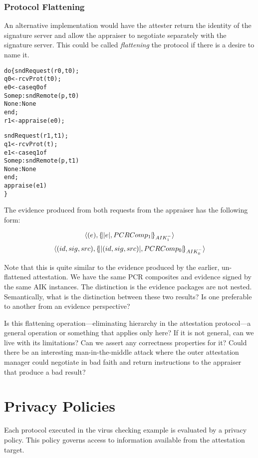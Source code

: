 \documentclass[10pt]{article}
\begin{document}
\subsubsection*{Protocol Flattening}

An alternative implementation would have the attester
return the identity of the signature server and allow the appraiser to
negotiate separately with the signature server.  This could be called
\emph{flattening} the protocol if there is a desire to name it.

\begin{alltt}
  do \{ sndRequest(r0,t0);
       q0 <- rcvProt(t0);
       e0 <- case q0 of
               Some p : sndRemote(p,t0)
               None : None
             end;
       r1 <- appraise(e0);
       
       sndRequest(r1,t1);
       q1 <- rcvProt(t);
       e1 <- case q1 of
               Some p : sndRemote(p,t1)
               None : None
             end;
       appraise(e1)
  \}
\end{alltt}

The evidence produced from both requests from the appraiser has the
following form:

\[\langle (e),\{\!\lvert \lvert e \rvert,PCRComp_1\rvert\!\}_{AIK_1^{-}}\rangle\]
\[\langle (id,sig,src),\{\!\lvert \lvert (id,sig,src) \rvert,PCRComp_0\rvert\!\}_{AIK_0^{-}}\rangle\]

Note that this is quite similar to the evidence produced by the
earlier, un-flattened attestation.  We have the same PCR composites
and evidence signed by the same AIK instances.  The distinction is the
evidence packages are not nested.  Semantically, what is the
distinction between these two results?  Is one preferable to another
from an evidence perspective?

Is this flattening operation---eliminating hierarchy in the
attestation protocol---a general operation or something that applies
only here?  If it is not general, can we live with its limitations?
Can we assert any correctness properties for it?  Could there be an
interesting man-in-the-middle attack where the outer attestation
manager could negotiate in bad faith and return instructions to the
appraiser that produce a bad result?

\section*{Privacy Policies}

Each protocol executed in the virus checking example is evaluated by a
privacy policy.  This policy governs access to information available
from the attestation target.  
\end{document}
